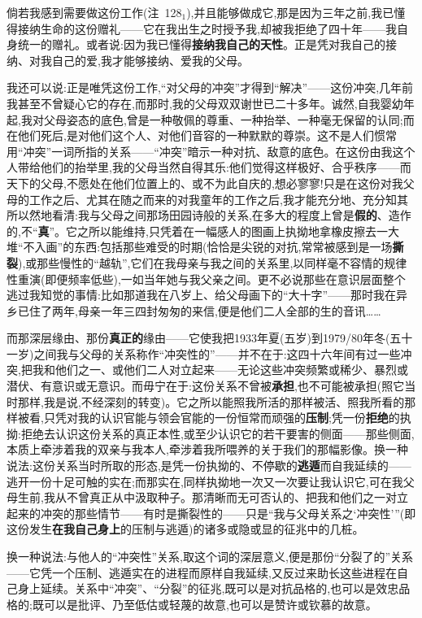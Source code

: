 倘若我感到需要做这份工作(注~128$_{1}$),并且能够做成它,那是因为三年之前,我已懂得接纳生命的这份赠礼——它在我出生之时授予我,却被我拒绝了四十年——我自身统一的赠礼。或者说:因为我已懂得\textbf{接纳我自己的天性}。正是凭对我自己的接纳、对我自己的爱,我才能够接纳、爱我的父母。

我还可以说:正是唯凭这份工作,“对父母的冲突”才得到“解决”——这份冲突,几年前我甚至不曾疑心它的存在,而那时\dmark{},我的父母双双谢世已二十多年。诚然,自我婴幼年起,我对父母姿态的底色,曾是一种敬佩的尊重、一种抬举、一种毫无保留的认同;而在他们死后,是对他们这个人、对他们音容的一种默默的尊崇。这不是人们惯常用“冲突”一词所指的关系——“冲突”暗示一种对抗、敌意的底色。在这份由我这个人带给他们的抬举里,我的父母当然自得其乐:他们觉得这样极好、合乎秩序——而天下的父母,不愿处在他们位置上的、或不为此自庆的,想必寥寥!只是在这份对我父母的工作之后、尤其在随之而来的对我童年的工作之后,我才能充分地、充分知其所以然地看清:我与父母之间那场田园诗般的关系,在多大的程度上曾是\textbf{假的}、造作的,不“\textbf{真}”。它之所以能维持,只凭着在一幅感人的图画上执拗地拿橡皮擦去一大堆“不入画”的东西:包括那些难受的时期(恰恰是尖锐的对抗,常常被感到是一场\textbf{撕裂}),或那些慢性的“越轨”,它们在我母亲与我之间的关系里,以同样毫不容情的规律性重演(即便频率低些),一如当年她与我父亲之间。更不必说那些在意识层面整个逃过我知觉的事情:比如那道我在八岁上、给父母画下的“大十字”——那时我在异乡已住了两年,母亲一年三四封匆匆的来信,便是他们二人全部的生的音讯……

而那深层缘由、那份\textbf{真正的}缘由——它使我把1933年夏(五岁)到1979/80年冬(五十一岁)之间我与父母的关系称作“冲突性的”——并不在于:这四十六年间有过一些冲突,把我和他们之一、或他们二人对立起来——无论这些冲突频繁或稀少、暴烈或潜伏、有意识或无意识。而毋宁在于:这份关系不曾被\textbf{承担},也不可能被承担(照它当时那样,我是说,不经深刻的转变)。它之所以能照我所活的那样被活、照我所看的那样被看,只凭对我的认识官能与领会官能的一份恒常而顽强的\textbf{压制};凭一份\textbf{拒绝}的执拗:拒绝去认识这份关系的真正本性,或至少认识它的若干要害的侧面——那些侧面,本质上牵涉着我的双亲与我本人,牵涉着我所喂养的关于我们的那幅影像。换一种说法:这份关系当时所取的形态,是凭一份执拗的、不停歇的\textbf{逃遁}而自我延续的——逃开一份十足可触的实在;而那实在,同样执拗地一次又一次要让我认识它,可在我父母生前,我从不曾真正从中汲取种子。那清晰而无可否认的、把我和他们之一对立起来的冲突的那些情节——有时是撕裂性的——只是“我与父母关系之‘冲突性’”(即这份发生\textbf{在我自己身上}的压制与逃遁)的诸多或隐或显的征兆中的几桩。

换一种说法:与他人的“冲突性”关系,取这个词的深层意义,便是那份“分裂了的”关系——它凭一个压制、逃遁实在的进程而原样自我延续,又反过来助长这些进程在自己身上延续。关系中“冲突”、“分裂”的征兆,既可以是对抗品格的,也可以是效忠品格的;既可以是批评、乃至低估或轻蔑的故意,也可以是赞许或钦慕的故意。

